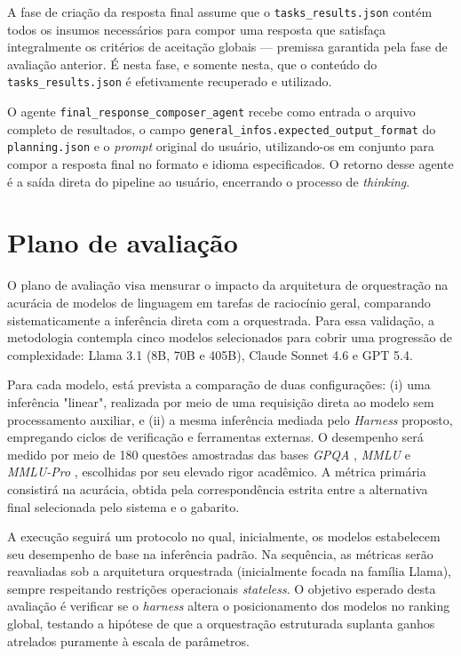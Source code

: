 \documentclass[a4paper,10pt,twocolumn]{article}
\begin{document}
A fase de criação da resposta final assume que o \texttt{tasks\_results.json} contém todos os insumos necessários para compor uma resposta que satisfaça integralmente os critérios de aceitação globais — premissa garantida pela fase de avaliação anterior. É nesta fase, e somente nesta, que o conteúdo do \texttt{tasks\_results.json} é efetivamente recuperado e utilizado.

O agente \texttt{final\_response\_composer\_agent} recebe como entrada o arquivo completo de resultados, o campo \texttt{general\_infos.expected\_output\_format} do \texttt{planning.json} e o \textit{prompt} original do usuário, utilizando-os em conjunto para compor a resposta final no formato e idioma especificados. O retorno desse agente é a saída direta do pipeline ao usuário, encerrando o processo de \textit{thinking}.


\section{Plano de avaliação}

O plano de avaliação visa mensurar o impacto da arquitetura de orquestração na acurácia de modelos de linguagem em tarefas de raciocínio geral, comparando sistematicamente a inferência direta com a orquestrada. Para essa validação, a metodologia contempla cinco modelos selecionados para cobrir uma progressão de complexidade: Llama 3.1 (8B, 70B e 405B), Claude Sonnet 4.6 e GPT 5.4.

Para cada modelo, está prevista a comparação de duas configurações: (i) uma inferência "linear", realizada por meio de uma requisição direta ao modelo sem processamento auxiliar, e (ii) a mesma inferência mediada pelo \textit{Harness} proposto, empregando ciclos de verificação e ferramentas externas. O desempenho será medido por meio de 180 questões amostradas das bases \textit{GPQA} \cite{rein2023gpqa}, \textit{MMLU} \cite{hendrycks2021measuring} e \textit{MMLU-Pro} \cite{wang2024mmlu-pro}, escolhidas por seu elevado rigor acadêmico. A métrica primária consistirá na acurácia, obtida pela correspondência estrita entre a alternativa final selecionada pelo sistema e o gabarito.

A execução seguirá um protocolo no qual, inicialmente, os modelos estabelecem seu desempenho de base na inferência padrão. Na sequência, as métricas serão reavaliadas sob a arquitetura orquestrada (inicialmente focada na família Llama), sempre respeitando restrições operacionais \textit{stateless}. O objetivo esperado desta avaliação é verificar se o \textit{harness} altera o posicionamento dos modelos no ranking global, testando a hipótese de que a orquestração estruturada suplanta ganhos atrelados puramente à escala de parâmetros.
\end{document}
